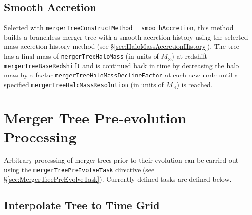 \subsection{Smooth Accretion}\label{sec:SmoothAccretion}

Selected with {\tt mergerTreeConstructMethod}$=${\tt smoothAccretion}, this method builds a branchless merger tree with a smooth accretion history using the selected mass accretion history method (see \S\ref{sec:HaloMassAccretionHistory}). The tree has a final mass of {\tt mergerTreeHaloMass} (in units of $M_\odot$) at redshift {\tt mergerTreeBaseRedshift} and is continued back in time by decreasing the halo mass by a factor {\tt mergerTreeHaloMassDeclineFactor} at each new node until a specified {\tt mergerTreeHaloMassResolution} (in units of $M_\odot$) is reached.

\section{Merger Tree Pre-evolution Processing}

Arbitrary processing of merger trees prior to their evolution can be carried out using the {\tt mergerTreePreEvolveTask} directive (see \S\ref{sec:MergerTreePreEvolveTask}). Currently defined tasks are defined below.

\subsection{Interpolate Tree to Time Grid}

